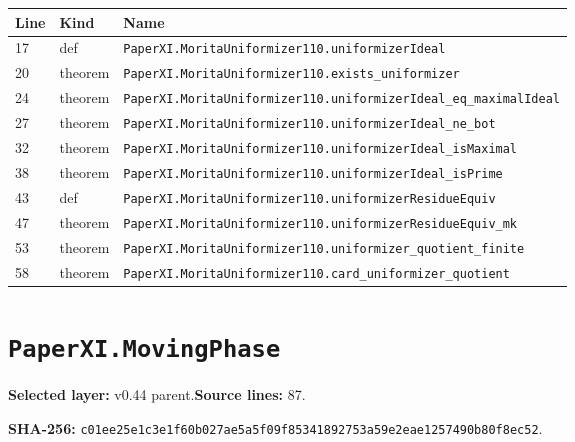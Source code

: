 \documentclass[10pt,oneside]{book}
\begin{document}
\begin{longtable}{@{}p{}p{}p{}@{}}\toprule Line&Kind&Name\\\midrule\endhead

17&def&\nolinkurl{PaperXI.MoritaUniformizer110.uniformizerIdeal}\\

20&theorem&\nolinkurl{PaperXI.MoritaUniformizer110.exists_uniformizer}\\

24&theorem&\nolinkurl{PaperXI.MoritaUniformizer110.uniformizerIdeal_eq_maximalIdeal}\\

27&theorem&\nolinkurl{PaperXI.MoritaUniformizer110.uniformizerIdeal_ne_bot}\\

32&theorem&\nolinkurl{PaperXI.MoritaUniformizer110.uniformizerIdeal_isMaximal}\\

38&theorem&\nolinkurl{PaperXI.MoritaUniformizer110.uniformizerIdeal_isPrime}\\

43&def&\nolinkurl{PaperXI.MoritaUniformizer110.uniformizerResidueEquiv}\\

47&theorem&\nolinkurl{PaperXI.MoritaUniformizer110.uniformizerResidueEquiv_mk}\\

53&theorem&\nolinkurl{PaperXI.MoritaUniformizer110.uniformizer_quotient_finite}\\

58&theorem&\nolinkurl{PaperXI.MoritaUniformizer110.card_uniformizer_quotient}\\

\bottomrule\end{longtable}

\section{\texorpdfstring{\nolinkurl{PaperXI.MovingPhase}}{PaperXI.MovingPhase}}\label{module:PaperXI.MovingPhase}

\textbf{Selected layer:} v0.44 parent.\quad\textbf{Source lines:} 87.\par\textbf{SHA-256:} {\scriptsize\nolinkurl{c01ee25e1c3e1f60b027ae5a5f09f85341892753a59e2eae1257490b80f8ec52}}.

\end{document}
